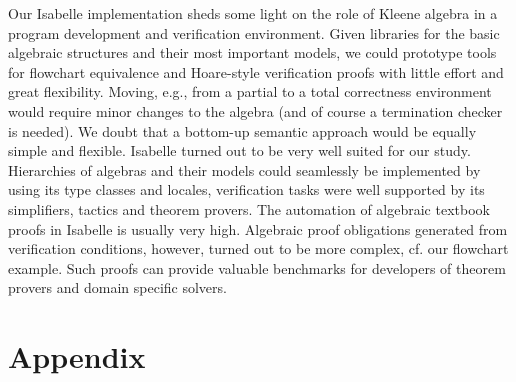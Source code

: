 \documentclass{llncs}
\begin{document}
Our Isabelle implementation sheds some light on the role of Kleene
algebra in a program development and verification environment. Given
libraries for the basic algebraic structures and their most important
models, we could prototype tools for flowchart equivalence and
Hoare-style verification proofs with little effort and great
flexibility. Moving, e.g., from a partial to a total correctness
environment would require minor changes to the algebra (and of course a
termination checker is needed). We doubt that a bottom-up semantic
approach would be equally simple and flexible. Isabelle turned out to
be very well suited for our study. Hierarchies of algebras and their
models could seamlessly be implemented by using its type classes and
locales, verification tasks were well supported by its simplifiers,
tactics and theorem provers. The automation of algebraic textbook
proofs in Isabelle is usually very high. Algebraic proof obligations
generated from verification conditions, however, turned out to be more
complex, cf. our flowchart example. Such proofs can provide valuable
benchmarks for developers of theorem provers and domain specific
solvers.




\newpage
\appendix
\section{Appendix}
\label{appendix}
\end{document}
